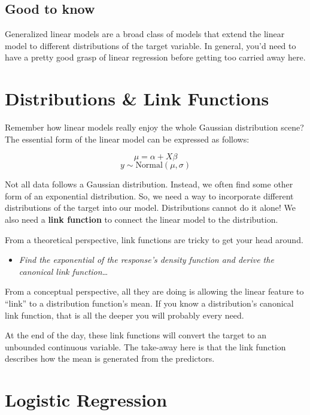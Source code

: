 \documentclass[
  letterpaper,
]{krantz}
\providecommand{\tightlist}{%
  \setlength{\itemsep}{0pt}\setlength{\parskip}{0pt}}\usepackage{longtable,booktabs,array}
\begin{document}
\subsection{Good to know}\label{sec-glm-good2know}

Generalized linear models are a broad class of models that extend the
linear model to different distributions of the target variable. In
general, you'd need to have a pretty good grasp of linear regression
before getting too carried away here.

\section{Distributions \& Link Functions}\label{sec-glm-distributions}

Remember how linear models really enjoy the whole Gaussian distribution
scene? The essential form of the linear model can be expressed as
follows:

\[
\mu = \alpha + X\beta
\] \[
y \sim \textrm{Normal}(\mu,\sigma)
\]

Not all data follows a Gaussian distribution. Instead, we often find
some other form of an exponential distribution. So, we need a way to
incorporate different distributions of the target into our model.
Distributions cannot do it alone! We also need a \textbf{link function}
to connect the linear model to the distribution.

From a theoretical perspective, link functions are tricky to get your
head around.

\begin{itemize}
\tightlist
\item
  \emph{Find the exponential of the response's density function and
  derive the canonical link function}\ldots{}
\end{itemize}

From a conceptual perspective, all they are doing is allowing the linear
feature to ``link'' to a distribution function's mean. If you know a
distribution's canonical link function, that is all the deeper you will
probably every need.

At the end of the day, these link functions will convert the target to
an unbounded continuous variable. The take-away here is that the link
function describes how the mean is generated from the predictors.

\section{Logistic Regression}\label{sec-glm-logistic}
\end{document}
